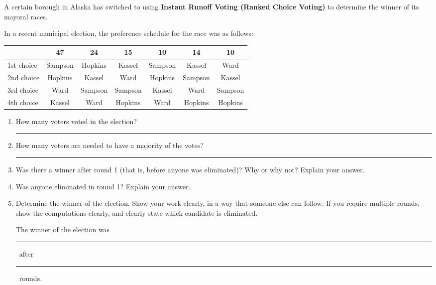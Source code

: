 \documentclass[12pt]{article}
\renewcommand{\emph}[1]{\textsf{\textbf{#1}}}
\newcounter{probcount}
\newcounter{subprobcount}
\def\problem#1{\setcounter{subprobcount}{0}%
\addtocounter{probcount}{1}{\emph{\arabic{probcount}.\hskip 1em(#1)}}\par}
\newenvironment{subproblems}{%
\begin{enumerate}%
\setcounter{enumi}{\value{subprobcount}}%
\renewcommand{\theenumi}{\emph{\alph{enumi}}}}%
{\setcounter{subprobcount}{\value{enumi}}\end{enumerate}}
\newcommand{\ans}[1][1in]{\rule{#1}{.5pt}}
\begin{document}
\newpage


\problem{20 points} 

A certain borough in Alaska has switched to using \emph{Instant Runoff Voting (Ranked Choice Voting) }to determine the winner of its mayoral races.

In a recent municipal election, the preference schedule for the race was as follows:

\begin{center}

\begin{tabular}{|l || c | c | c | c | c| c|}
\hline
& 47& 24& 15& 10& 14&10\\ \hline
1st choice & Sampson & Hopkins & Kassel & Sampson & Kassel & Ward\\
2nd choice & Hopkins & Kassel & Ward & Hopkins & Sampson& Kassel\\
3rd choice & Ward & Sampson & Sampson & Kassel & Ward & Sampson\\
4th choice & Kassel & Ward & Hopkins & Ward & Hopkins & Hopkins\\
\hline
\end{tabular}

\end{center}

\begin{subproblems}
\item How many voters voted in the election?  \ans %

\vspace{.25in}

\item How many voters are needed to have a majority of the votes? \ans

\vspace{.25in}

\item Was there a winner after round 1 (that is, before anyone was eliminated)? Why or why not? Explain your answer.

\vspace{.5in}

\item Was anyone eliminated in round 1?  Explain your answer.

\vspace{.5in}

\item Determine the winner of the election. Show your work clearly, in a way that someone else can follow. If you require multiple rounds, show the computations clearly, and clearly state which candidate is eliminated.

\vfill


The winner of the election was \ans\ after \ans\ rounds.
\end{subproblems}
\newpage
\end{document}
